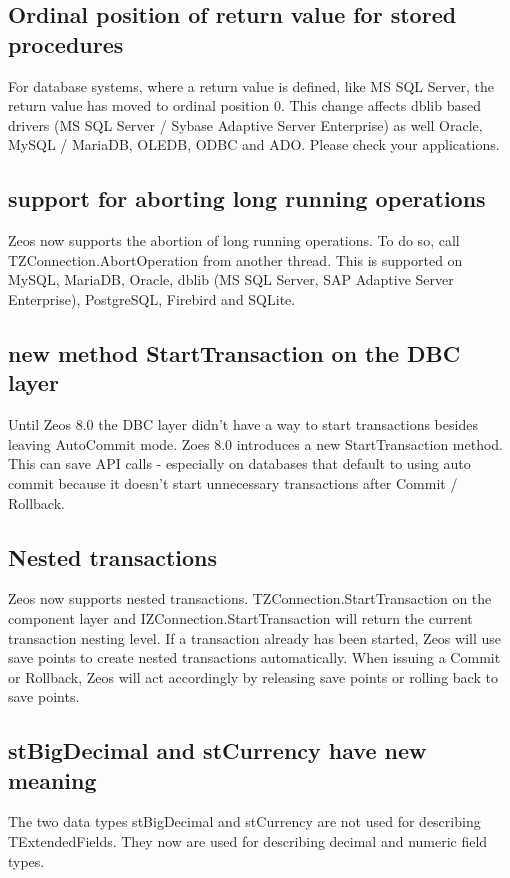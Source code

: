 \documentclass[a4paper,12pt,oneside]{article}
\begin{document}
\subsection{Ordinal position of return value for stored procedures}
For database systems, where a return value is defined, like MS SQL Server, the return value has moved to ordinal position 0.
This change affects dblib based drivers (MS SQL Server / Sybase Adaptive Server Enterprise) as well Oracle, MySQL / MariaDB, OLEDB, ODBC and ADO.
Please check your applications.

\subsection{support for aborting long running operations}
Zeos now supports the abortion of long running operations.
To do so, call TZConnection.AbortOperation from another thread.
This is supported on MySQL, MariaDB, Oracle, dblib (MS SQL Server, SAP Adaptive Server Enterprise), PostgreSQL, Firebird and SQLite.

\subsection{new method StartTransaction on the DBC layer}
Until Zeos 8.0 the DBC layer didn't have a way to start transactions besides leaving AutoCommit mode.
Zoes 8.0 introduces a new StartTransaction method.
This can save API calls - especially on databases that default to using auto commit because it doesn't start unnecessary transactions after Commit / Rollback.

\subsection{Nested transactions}
Zeos now supports nested transactions. TZConnection.StartTransaction on the component layer and IZConnection.StartTransaction will return the current transaction nesting level.
If a transaction already has been started, Zeos will use save points to create nested transactions automatically.
When issuing a Commit or Rollback, Zeos will act accordingly by releasing save points or rolling back to save points.

\subsection{stBigDecimal and stCurrency have new meaning}
The two data types stBigDecimal and stCurrency are not used for describing TExtendedFields.
They now are used for describing decimal and numeric field types.
\end{document}

